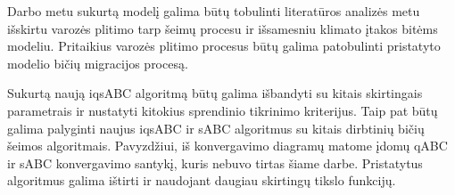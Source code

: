 \documentclass{VUMIFPSmagistrinis}
\begin{document}
Darbo metu sukurtą modelį galima būtų tobulinti literatūros analizės metu išskirtu varozės plitimo tarp šeimų procesu ir išsamesniu klimato įtakos bitėms modeliu. Pritaikius varozės plitimo procesus būtų galima patobulinti pristatyto modelio bičių migracijos procesą.




Sukurtą naują iqsABC algoritmą būtų galima išbandyti su kitais skirtingais parametrais ir nustatyti kitokius sprendinio tikrinimo kriterijus. Taip pat būtų galima palyginti naujus iqsABC ir sABC algoritmus su kitais dirbtinių bičių šeimos algoritmais. Pavyzdžiui, iš konvergavimo diagramų matome įdomų qABC ir sABC konvergavimo santykį, kuris nebuvo tirtas šiame darbe. Pristatytus algoritmus galima ištirti ir naudojant daugiau skirtingų tikslo funkcijų.



\end{document}
